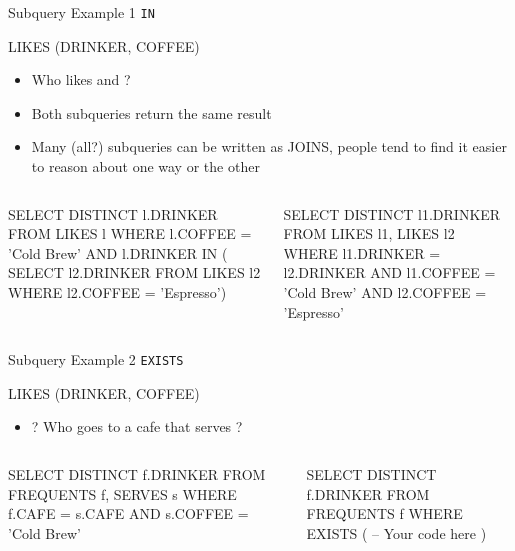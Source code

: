 \documentclass[aspectratio=169]{beamer}
\newenvironment{noindentitemize}
{ \begin{itemize}
 \setlength{\itemsep}{1.5ex}
  \setlength{\parsep}{0pt}   
  \setlength{\parskip}{0pt}
 \addtolength{\leftskip}{-2em}
 }
{ \end{itemize} }
\begin{document}
\begin{frame}[fragile]{Subquery Example 1 \texttt{IN}}

LIKES (DRINKER, COFFEE)

\begin{noindentitemize}
\item Who likes \textquotesingle and \textquotesingle?
\item Both subqueries return the same result
\item Many (all?) subqueries can be written as JOINS, people tend to find it easier to reason about one way or the other
\end{noindentitemize}

\begin{columns}[T]
\begin{column}{0.5\textwidth}
\begin{SQL}
SELECT DISTINCT l.DRINKER
FROM LIKES l
WHERE l.COFFEE = 'Cold Brew' 
	AND l.DRINKER IN (
		SELECT l2.DRINKER 
		FROM LIKES l2 
		WHERE l2.COFFEE = 'Espresso')
\end{SQL}
\end{column}
\begin{column}{0.5\textwidth}
\begin{SQL}
SELECT DISTINCT l1.DRINKER
FROM LIKES l1, LIKES l2
WHERE l1.DRINKER = l2.DRINKER 
	AND l1.COFFEE = 'Cold Brew'     
	AND l2.COFFEE = 'Espresso'
\end{SQL}
\end{column}
\end{columns}

\end{frame}
\begin{frame}[fragile]{Subquery Example 2 \texttt{EXISTS}}

LIKES (DRINKER, COFFEE)

\begin{noindentitemize}
\item[?] Who goes to a cafe that serves \textquotesingle?
\end{noindentitemize}

\begin{columns}[T]
\begin{column}{0.5\textwidth}
\begin{SQL}
SELECT DISTINCT f.DRINKER
FROM FREQUENTS f, SERVES s
WHERE f.CAFE = s.CAFE
	AND s.COFFEE = 'Cold Brew'
\end{SQL}
\end{column}
\begin{column}{0.5\textwidth}
\begin{SQL}
SELECT DISTINCT f.DRINKER
FROM FREQUENTS f
WHERE EXISTS (
	-- Your code here
	)
\end{SQL}
\end{column}
\end{columns}

\end{frame}
\end{document}
